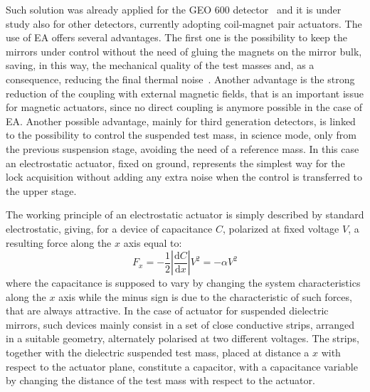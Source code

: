 Such solution was already applied for the GEO 600 detector~\cite{GeoCal} and it is under study also for other detectors, currently adopting coil-magnet pair actuators. The use of EA offers several advantages. The first one is the possibility to keep the mirrors under control without the need of gluing the magnets on the mirror bulk, saving, in this way, the mechanical quality of the test masses and, as a consequence, reducing the final thermal noise~\cite{Amico}. Another advantage is the strong reduction of the coupling with external magnetic fields, that is an important issue for magnetic actuators, since no direct coupling is anymore possible in the case of EA. Another possible advantage, mainly for third generation detectors, is linked to the possibility to control the suspended test mass, in science mode, only from the previous suspension stage, avoiding the need of a reference mass. In this case an electrostatic actuator, fixed on ground, represents the simplest way for the lock acquisition without adding any extra noise when the control is transferred to the upper stage.

The working principle of an electrostatic actuator is simply described by standard electrostatic, giving, for a device of capacitance $C$, polarized at fixed voltage $V$, a resulting force along the $x$ axis equal to:
\begin{equation}
\label{eqn:force_base}
F_x = - \frac{1}{2} \left| \frac{\mathrm{d} C}{\mathrm{d} x} \right| V^2=-\alpha V^2
\end{equation}
where the capacitance is supposed to vary by changing the system characteristics along the $x$ axis while the minus sign is due to the characteristic of such forces, that are always attractive.
In the case of actuator for suspended dielectric mirrors, such devices mainly consist in a set of close conductive strips, arranged in a suitable geometry, alternately polarised at two different voltages.
The strips, together with the dielectric suspended test mass, placed at distance a $x$ with respect to the actuator plane, constitute a capacitor, with a capacitance variable by changing the distance of the test mass with respect to the actuator.

